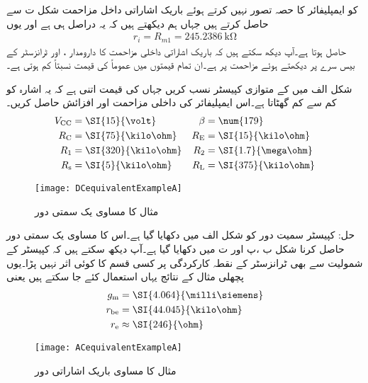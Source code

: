   کو ایمپلیفائر کا حصہ تصور نہیں کرتے ہوئے باریک اشاراتی داخل مزاحمت   شکل  ت سے حاصل کرتے ہیں جہاں ہم دیکھتے ہیں کہ یہ دراصل  ہی ہے اور یوں
\begin{align*}
r_i=R_{m1}=\SI{245.2386}{\kilo \ohm}
\end{align*}
حاصل ہوتا ہے۔آپ دیکھ سکتے ہیں کہ باریک اشاراتی داخلی مزاحمت کا دارومدار ، اور ٹرانزسٹر کے بیس سرے پر دیکھتے ہوئے مزاحمت   پر ہے۔ان تمام قیمتوں میں عموماً  کی قیمت نسبتاً کم ہوتی ہے۔


شکل  الف میں   کے متوازی کپیسٹر  نسب کریں جہاں   کی قیمت اتنی ہے کہ یہ اشارہ کو کم سے کم گھٹاتا ہے۔اس ایمپلیفائر کی داخلی مزاحمت  اور افزائش  حاصل کریں۔
\begin{align*}
V_{\textup{CC}} &=\SI{15}{\volt} & \beta&=\num{179}\\
R_{\textup{C}} &=\SI{75}{\kilo \ohm} &  R_{\textup{E}} &=\SI{15}{\kilo \ohm}\\
R_{\textup{1}} &=\SI{320}{\kilo \ohm} & R_{\textup{2}} &=\SI{1.7}{\mega \ohm}\\
R_{\textup{s}} &=\SI{5}{\kilo \ohm} & R_{\textup{L}} &=\SI{375}{\kilo \ohm}
\end{align*}
%
\begin{figure}
\centering
\texttt{[image: DCequivalentExampleA]}
\caption{مثال کا مساوی یک سمتی دور}
\label{شکل_مثال_کا_مساوی_یک_سمتی_دور_الف}
\end{figure}
حل: کپیسٹر سمیت دور کو شکل  الف میں دکھایا گیا ہے۔اس کا مساوی یک سمتی دور حاصل کرنا شکل  ب ،پ اور ت میں دکھایا گیا ہے۔آپ دیکھ سکتے ہیں کہ کپیسٹر  کے شمولیت سے بھی ٹرانزسٹر کے نقطہ کارکردگی پر کسی قسم کا کوئی اثر نہیں پڑا۔یوں پچھلی مثال کے نتائج یہاں استعمال کئے جا سکتے ہیں یعنی
\begin{align*}
g_{\textup{m}} &=\SI{4.064}{\milli \siemens}\\
r_{\textup{be}}&=\SI{44.045}{\kilo \ohm}\\
r_{\textup{e}} &\approx \SI{246}{\ohm}
\end{align*}
%
\begin{figure}
\centering
\texttt{[image: ACequivalentExampleA]}
\caption{مثال کا مساوی باریک اشاراتی دور}
\label{شکل_کا_باریک_اشاراتی_دور_الف}
\end{figure}
